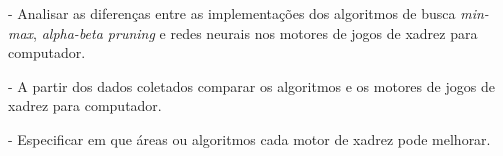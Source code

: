 - Analisar as diferenças entre as implementações dos algoritmos de busca \textit{min-max}, \textit{alpha-beta pruning} e
redes neurais nos motores de jogos de xadrez para computador.

- A partir dos dados coletados comparar os algoritmos e os motores de jogos de xadrez para computador.

- Especificar  em que áreas ou algoritmos cada motor de xadrez pode melhorar.



